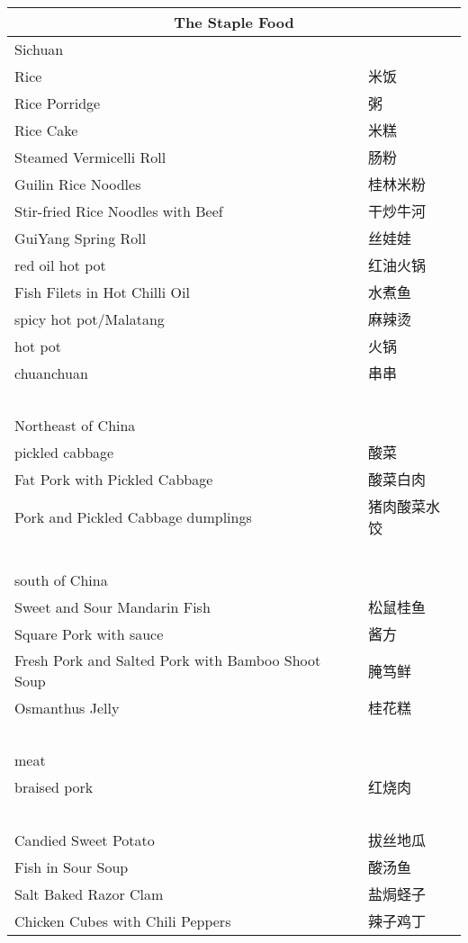 \begin{longtable}{|p{7cm}|p{7cm}|}
    \multicolumn{2}{c}{\textbf{The Staple Food}} \\ \hline
    Sichuan & ~ \\ \hline
    Rice & 米饭 \\ \hline
    Rice Porridge & 粥 \\ \hline
    Rice Cake & 米糕 \\ \hline
    Steamed Vermicelli Roll & 肠粉 \\ \hline
    Guilin Rice Noodles & 桂林米粉 \\ \hline
    Stir-fried Rice Noodles with Beef & 干炒牛河 \\ \hline
    GuiYang Spring Roll & 丝娃娃 \\ \hline
    red oil hot pot & 红油火锅 \\ \hline
    Fish Filets in Hot Chilli Oil & 水煮鱼 \\ \hline
    spicy hot pot/Malatang & 麻辣烫 \\ \hline
    hot pot & 火锅 \\ \hline
    chuanchuan & 串串 \\ \hline
    ~ & ~ \\ \hline
    Northeast of China & ~ \\ \hline
    pickled cabbage & 酸菜 \\ \hline
    Fat Pork with Pickled Cabbage & 酸菜白肉 \\ \hline
    Pork and Pickled Cabbage dumplings & 猪肉酸菜水饺 \\ \hline
    ~ & ~ \\ \hline
    south of China & ~ \\ \hline
    Sweet and Sour Mandarin Fish & 松鼠桂鱼 \\ \hline
    Square Pork with sauce & 酱方 \\ \hline
    Fresh Pork and Salted Pork with Bamboo Shoot Soup & 腌笃鲜 \\ \hline
    Osmanthus Jelly & 桂花糕 \\ \hline
    ~ & ~ \\ \hline
    meat & ~ \\ \hline
    braised pork & 红烧肉 \\ \hline
    ~ & ~ \\ \hline
    Candied Sweet Potato & 拔丝地瓜 \\ \hline
    Fish in Sour Soup & 酸汤鱼 \\ \hline
    Salt Baked Razor Clam & 盐焗蛏子 \\ \hline
    Chicken Cubes with Chili Peppers & 辣子鸡丁 \\ \hline

\end{longtable}
